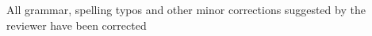 \documentclass[a4paper,12pt]{article}
\begin{document}
\begin{reviewer}
% 
% 
% 
% 
% 
% 
% 
% 
% 


\reply All grammar, spelling typos and other minor corrections suggested by the reviewer have been corrected


\end{reviewer}
\end{document}
